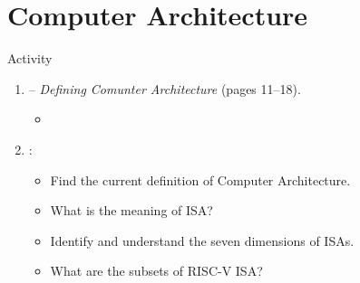 \section{Computer Architecture}

\begin{frame}[t]{Activity}
\begin{enumerate}
  \item {}  -- 
        \emph{Defining Comunter Architecture} (pages 11--18).
    \begin{itemize}
      \item \credithennessy
    \end{itemize}

  \item {}:
    \begin{itemize}
      \item Find the current definition of Computer Architecture.
      \item What is the meaning of ISA?
      \item Identify and understand the seven dimensions of ISAs.
      \item What are the subsets of RISC-V ISA?
    \end{itemize}
\end{enumerate}
\end{frame}
